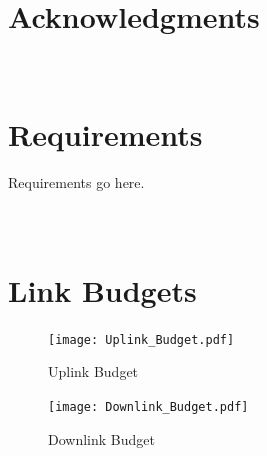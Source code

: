 \documentclass[12pt]{article}
\begin{document}
\section{Acknowledgments}
	
	

\newpage
\appendix
\section{\\Requirements} \label{app:requirements}
Requirements go here.

\newpage
\section{\\Link Budgets} \label{app:link_budgets}

\begin{figure}[ht]
\centering 
\caption{Uplink Budget}
\texttt{[image: Uplink\_Budget.pdf]}
\end{figure}

\newpage

\begin{figure}[ht]
\centering 
\caption{Downlink Budget}
\texttt{[image: Downlink\_Budget.pdf]}
\end{figure}


\newpage
\end{document}
